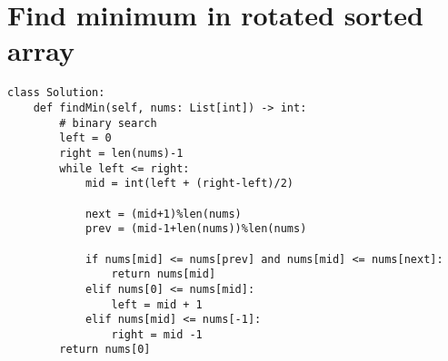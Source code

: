 \documentclass[24pt, a4]{article}
\begin{document}
\section{Find minimum in rotated sorted array}
\begin{lstlisting}
class Solution:
    def findMin(self, nums: List[int]) -> int:
        # binary search
        left = 0
        right = len(nums)-1
        while left <= right:
            mid = int(left + (right-left)/2)
            
            next = (mid+1)%len(nums)
            prev = (mid-1+len(nums))%len(nums)
            
            if nums[mid] <= nums[prev] and nums[mid] <= nums[next]:
                return nums[mid]
            elif nums[0] <= nums[mid]:
                left = mid + 1
            elif nums[mid] <= nums[-1]:
                right = mid -1
        return nums[0]
\end{lstlisting}
\end{document}
